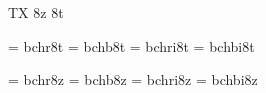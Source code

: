 
\ifx\ffdecl\undefined  \fi

\ffdecl [Charter] {} {\rm \bf \it \bi} {} {TX} {8z 8t}

\ismacro{}\ifttrue

   \font\tenrm = bchr8t
   \font\tenbf = bchb8t
   \font\tenit = bchri8t
   \font\tenbi = bchbi8t

\fi

\ismacro{}\ifttrue

   \font\tenrm = bchr8z
   \font\tenbf = bchb8z
   \font\tenit = bchri8z
   \font\tenbi = bchbi8z
   

\fi

\tenrm

\ifx\loadmathfonts\relax \endinput \fi
\ifx\mathpreloaded X\else  \fi                     

